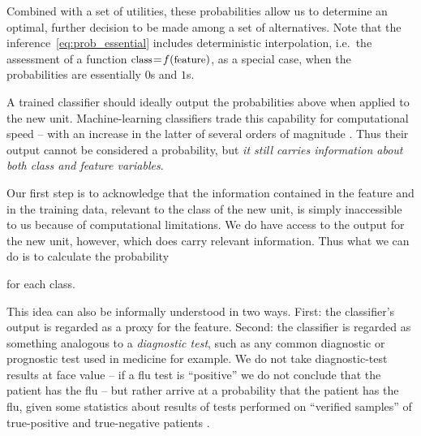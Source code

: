 \documentclass[\ifafour a4paper,12pt,\else a5paper,10pt,\fi%
onecolumn,oneside,article,%
british%
]{memoir}
\newcommand*{\widefbox}[1]{\fbox{\hspace{1em}#1\hspace{1em}}}
\theoremstyle{remark}
\theoremstyle{innote}
\renewcommand*{\P}{\mathrm{P}}%
\renewcommand*{\|}[1][]{\nonscript\:#1\vert\nonscript\:\mathopen{}}
\newcommand*{\mo}[1][=]{\mathrel{\mkern-3.5mu#1\mkern-3.5mu}}
\newcommand*{\sect}{\S}%
\newcommand*{\chap}{ch.}%
\newcommand*{\eg}{{e.g.}}
\newcommand*{\ie}{{i.e.}}
\newcommand*{\texts}[1]{\text{\small #1}}
\begin{document}
Combined with a set of utilities, these probabilities allow us to determine an optimal, further decision to be made among a set of alternatives. Note that the inference~\eqref{eq:prob_essential} includes deterministic interpolation, \ie\ the assessment of a function $\texts{class} \mo f(\texts{feature})$, as a special case, when the probabilities are essentially $0$s and $1$s.

A trained classifier should ideally output the probabilities above when applied to the new unit. Machine-learning classifiers trade this capability for computational speed -- with an increase in the latter of several orders of magnitude \autocites[to understand this trade-off in the case of neural-network classifiers see \eg][]{mackay1992,mackay1992b,mackay1992d}[\sect~16.5 esp.~16.5.7]{murphy2012}[see also the discussion by][]{selfetal1987}. Thus their output cannot be considered a probability, but \emph{it still carries information about both class and feature variables}.


Our first step is to acknowledge that the information contained in the feature and in the training data, relevant to the class of the new unit, is simply inaccessible to us because of computational limitations. We do have access to the output for the new unit, however, which does carry relevant information. Thus what we can do is to calculate the probability
for each class.


This idea can also be informally understood in two ways. First: the classifier's output is regarded as a proxy for the feature. Second: the classifier is regarded as something analogous to a \emph{diagnostic test}, such as any common diagnostic or prognostic test used in medicine for example. We do not take diagnostic-test results at face value -- if a flu test is \enquote{positive} we do not conclude that the patient has the flu -- but rather arrive at a probability that the patient has the flu, given some statistics about results of tests performed on \enquote{verified samples} of true-positive and true-negative patients \autocites[\chap~5]{soxetal1988_r2013}[\chap~5]{huninketal2001_r2014}[see also][]{jennyetal2018}.
\end{document}
